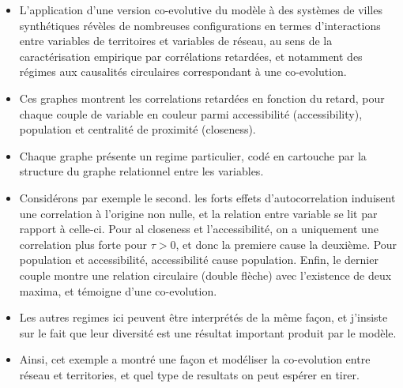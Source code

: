 \documentclass[12pt]{article}
\begin{document}
\begin{itemize}
	\item L'application d'une version co-evolutive du modèle à des systèmes de villes synthétiques révèles de nombreuses configurations en termes d'interactions entre variables de territoires et variables de réseau, au sens de la caractérisation empirique par corrélations retardées, et notamment des régimes aux causalités circulaires correspondant à une co-evolution.
	\item Ces graphes montrent les correlations retardées en fonction du retard, pour chaque couple de variable en couleur parmi accessibilité (accessibility), population et centralité de proximité (closeness).
	\item Chaque graphe présente un regime particulier, codé en cartouche par la structure du graphe relationnel entre les variables.
	\item Considérons par exemple le second. les forts effets d'autocorrelation induisent une correlation à l'origine non nulle, et la relation entre variable se lit par rapport à celle-ci. Pour al closeness et l'accessibilité, on a uniquement une correlation plus forte pour $\tau > 0$, et donc la premiere cause la deuxième. Pour population et accessibilité, accessibilité cause population. Enfin, le dernier couple montre une relation circulaire (double flèche) avec l'existence de deux maxima, et témoigne d'une co-evolution.
	\item Les autres regimes ici peuvent être interprétés de la même façon, et j'insiste sur le fait que leur diversité est une résultat important produit par le modèle.
	\item Ainsi, cet exemple a montré une façon et modéliser la co-evolution entre réseau et territories, et quel type de resultats on peut espérer en tirer.
\end{itemize}

\end{document}
